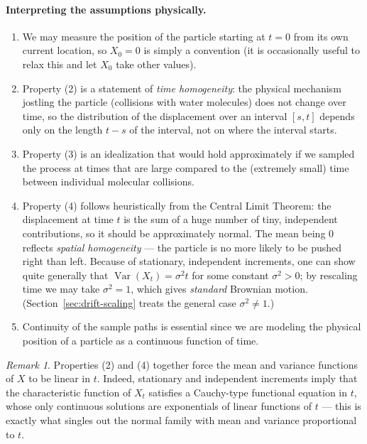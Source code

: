 \documentclass[12pt,openany]{book}
\theoremstyle{definition}
\theoremstyle{remark}
\newtheorem{remark}[theorem]{Remark}
\DeclareMathOperator{\Var}{Var}
\begin{document}
\paragraph{Interpreting the assumptions physically.}
\begin{enumerate}[label=(\arabic*)]
    \item We may measure the position of the particle starting at $t=0$ from its own current location, so $X_0=0$ is simply a convention (it is occasionally useful to relax this and let $X_0$ take other values).
    \item Property (2) is a statement of \emph{time homogeneity}: the physical mechanism jostling the particle (collisions with water molecules) does not change over time, so the distribution of the displacement over an interval $[s,t]$ depends only on the length $t-s$ of the interval, not on where the interval starts.
    \item Property (3) is an idealization that would hold approximately if we sampled the process at times that are large compared to the (extremely small) time between individual molecular collisions.
    \item Property (4) follows heuristically from the Central Limit Theorem: the displacement at time $t$ is the sum of a huge number of tiny, independent contributions, so it should be approximately normal. The mean being $0$ reflects \emph{spatial homogeneity} — the particle is no more likely to be pushed right than left. Because of stationary, independent increments, one can show quite generally that $\Var(X_t) = \sigma^2 t$ for some constant $\sigma^2 > 0$; by rescaling time we may take $\sigma^2 = 1$, which gives \emph{standard} Brownian motion. (Section~\ref{sec:drift-scaling} treats the general case $\sigma^2 \ne 1$.)
    \item Continuity of the sample paths is essential since we are modeling the physical position of a particle as a continuous function of time.
\end{enumerate}
 
\begin{remark}
Properties (2) and (4) together force the mean and variance functions of $X$ to be linear in $t$. Indeed, stationary and independent increments imply that the characteristic function of $X_t$ satisfies a Cauchy-type functional equation in $t$, whose only continuous solutions are exponentials of linear functions of $t$ — this is exactly what singles out the normal family with mean and variance proportional to $t$.
\end{remark}
 
\end{document}
